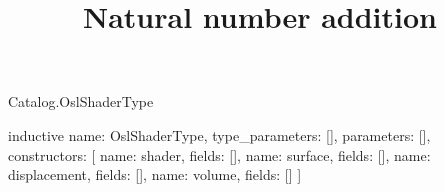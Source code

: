\begin{lexlean}{Catalog.OslShaderType}
\title{Natural number addition}
\begin{semanticmodule}
inductive{
  name: OslShaderType,
  type_parameters: [],
  parameters: [],
  constructors: [
    {name: shader, fields: []},
    {name: surface, fields: []},
    {name: displacement, fields: []},
    {name: volume, fields: []}
  ]
}
\end{semanticmodule}
\end{lexlean}
